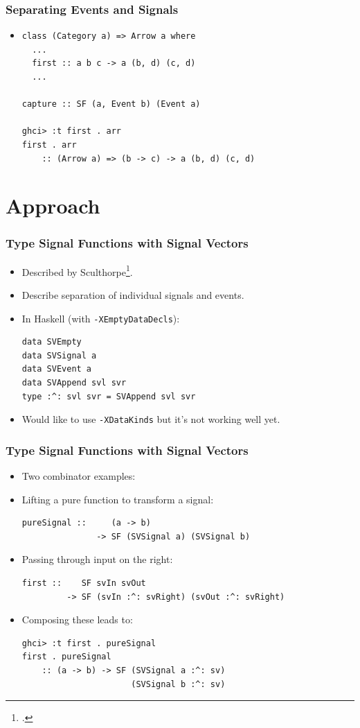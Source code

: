\documentclass{beamer}
\begin{document}
\begin{frame}[fragile]
\frametitle{Separating Events and Signals}
    \begin{itemize}
        \item[]
\begin{Verbatim}
class (Category a) => Arrow a where
  ...
  first :: a b c -> a (b, d) (c, d)
  ...

capture :: SF (a, Event b) (Event a)

ghci> :t first . arr
first . arr
    :: (Arrow a) => (b -> c) -> a (b, d) (c, d)
\end{Verbatim}
    \end{itemize}
\end{frame}

\section{Approach}

\begin{frame}[fragile]
\frametitle{Type Signal Functions with Signal Vectors}

    \begin{itemize}
        \item Described by Sculthorpe\footcite{Sculthorpe2011}.
        \item Describe separation of individual signals and events.
        \item In Haskell (with {\tt -XEmptyDataDecls}):
\begin{Verbatim}
data SVEmpty
data SVSignal a
data SVEvent a
data SVAppend svl svr
type :^: svl svr = SVAppend svl svr
\end{Verbatim}
        \item Would like to use {\tt -XDataKinds} but it's not working well yet.
    \end{itemize}

\end{frame}

\begin{frame}[fragile]
\frametitle{Type Signal Functions with Signal Vectors}

    \begin{itemize}
        \item Two combinator examples:
        \item Lifting a pure function to transform a signal:
\begin{Verbatim}
pureSignal ::     (a -> b)
               -> SF (SVSignal a) (SVSignal b)
\end{Verbatim}
        \item Passing through input on the right:
\begin{Verbatim}
first ::    SF svIn svOut
         -> SF (svIn :^: svRight) (svOut :^: svRight)
\end{Verbatim}
        \item Composing these leads to:
\begin{Verbatim}
ghci> :t first . pureSignal
first . pureSignal
    :: (a -> b) -> SF (SVSignal a :^: sv)
                      (SVSignal b :^: sv)
\end{Verbatim}
    \end{itemize}
\end{frame}
\end{document}
